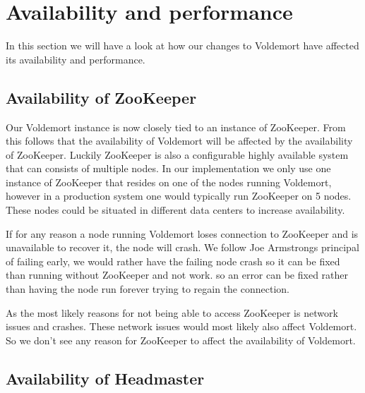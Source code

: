 \section{Availability and performance}
In this section we will have a look at how our changes to Voldemort have affected its availability and performance. 

\subsection{Availability of ZooKeeper}
Our Voldemort instance is now closely tied to an instance of ZooKeeper. From this follows that the availability of Voldemort will be affected by the availability of ZooKeeper. Luckily ZooKeeper is also a configurable highly available system that can consists of multiple nodes. In our implementation we only use one instance of ZooKeeper that resides on one of the nodes running Voldemort, however in a production system one would typically run ZooKeeper on 5 nodes. These nodes could be situated in different data centers to increase availability.

If for any reason a node running Voldemort loses connection to ZooKeeper and is unavailable to recover it, the node will crash. We follow Joe Armstrongs principal of failing early, we would rather have the failing node crash so it can be fixed than running without ZooKeeper and not work. so an error can be fixed rather than having the node run forever trying to regain the connection. 

As the most likely reasons for not being able to access ZooKeeper is network issues and crashes. These network issues would most likely also affect Voldemort. So we don't see any reason for ZooKeeper to affect the availability of Voldemort.

\subsection{Availability of Headmaster}


